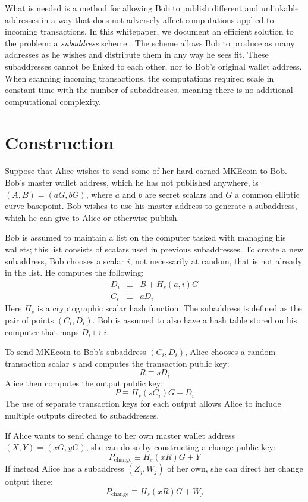 \documentclass{mrl}
\begin{document}
What is needed is a method for allowing Bob to publish different and unlinkable addresses in a way that does not adversely affect computations applied to incoming transactions. In this whitepaper, we document an efficient solution to the problem: a \textit{subaddress} scheme \cite{pr}. The scheme allows Bob to produce as many addresses as he wishes and distribute them in any way he sees fit. These subaddresses cannot be linked to each other, nor to Bob's original wallet address. When scanning incoming transactions, the computations required scale in constant time with the number of subaddresses, meaning there is no additional computational complexity.


\section{Construction}
Suppose that Alice wishes to send some of her hard-earned MKEcoin to Bob. Bob's master wallet address, which he has not published anywhere, is $(A,B) = (aG, bG)$, where $a$ and $b$ are secret scalars and $G$ a common elliptic curve basepoint. Bob wishes to use his master address to generate a subaddress, which he can give to Alice or otherwise publish.

Bob is assumed to maintain a list on the computer tasked with managing his wallets; this list consists of scalars used in previous subaddresses. To create a new subaddress, Bob chooses a scalar $i$, not necessarily at random, that is not already in the list. He computes the following:
\begin{eqnarray*}
D_i &\equiv& B + H_s(a,i)G \\
C_i &\equiv& aD_i
\end{eqnarray*}
Here $H_s$ is a cryptographic scalar hash function. The subaddress is defined as the pair of points $(C_i,D_i)$. Bob is assumed to also have a hash table stored on his computer that maps $D_i \mapsto i$.

To send MKEcoin to Bob's subaddress $(C_i,D_i)$, Alice chooses a random transaction scalar $s$ and computes the transaction public key:
$$R \equiv sD_i$$
Alice then computes the output public key:
$$P \equiv H_s(sC_i)G + D_i$$
The use of separate transaction keys for each output allows Alice to include multiple outputs directed to subaddresses.

If Alice wants to send change to her own master wallet address $(X,Y) = (xG,yG)$, she can do so by constructing a change public key:
$$P_{\operatorname{change}} \equiv H_s(xR)G + Y$$
If instead Alice has a subaddress $(Z_j,W_j)$ of her own, she can direct her change output there:
$$P_{\operatorname{change}} \equiv H_s(xR)G + W_j$$
\end{document}
